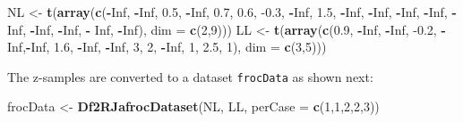 \documentclass[
]{book}
\newenvironment{Shaded}{\begin{snugshade}}{\end{snugshade}}
\newcommand{\DataTypeTok}[1]{\textcolor[rgb]{0.13,0.29,0.53}{#1}}
\newcommand{\DecValTok}[1]{\textcolor[rgb]{0.00,0.00,0.81}{#1}}
\newcommand{\FloatTok}[1]{\textcolor[rgb]{0.00,0.00,0.81}{#1}}
\newcommand{\KeywordTok}[1]{\textcolor[rgb]{0.13,0.29,0.53}{\textbf{#1}}}
\newcommand{\NormalTok}[1]{#1}
\newcommand{\OperatorTok}[1]{\textcolor[rgb]{0.81,0.36,0.00}{\textbf{#1}}}
\newcommand{\OtherTok}[1]{\textcolor[rgb]{0.56,0.35,0.01}{#1}}
\newcommand{\StringTok}[1]{\textcolor[rgb]{0.31,0.60,0.02}{#1}}
\begin{document}
\begin{Shaded}
\begin{Highlighting}[]
\NormalTok{NL <-}\StringTok{ }\KeywordTok{t}\NormalTok{(}\KeywordTok{array}\NormalTok{(}\KeywordTok{c}\NormalTok{(}\OperatorTok{-}\OtherTok{Inf}\NormalTok{, }\OperatorTok{-}\OtherTok{Inf}\NormalTok{,  }
                 \FloatTok{0.5}\NormalTok{, }\OperatorTok{-}\OtherTok{Inf}\NormalTok{, }
                 \FloatTok{0.7}\NormalTok{, }\FloatTok{0.6}\NormalTok{, }
                \FloatTok{-0.3}\NormalTok{, }\OperatorTok{-}\OtherTok{Inf}\NormalTok{, }
                 \FloatTok{1.5}\NormalTok{, }\OperatorTok{-}\OtherTok{Inf}\NormalTok{, }
                \OperatorTok{-}\OtherTok{Inf}\NormalTok{, }\OperatorTok{-}\OtherTok{Inf}\NormalTok{, }
                \OperatorTok{-}\OtherTok{Inf}\NormalTok{, }\OperatorTok{-}\OtherTok{Inf}\NormalTok{, }
                \OperatorTok{-}\OtherTok{Inf}\NormalTok{, }\OperatorTok{-}\OtherTok{Inf}\NormalTok{,}
              \OperatorTok{-}\StringTok{  }\OtherTok{Inf}\NormalTok{, }\OperatorTok{-}\OtherTok{Inf}\NormalTok{), }\DataTypeTok{dim =} \KeywordTok{c}\NormalTok{(}\DecValTok{2}\NormalTok{,}\DecValTok{9}\NormalTok{)))}
\NormalTok{LL <-}\StringTok{ }\KeywordTok{t}\NormalTok{(}\KeywordTok{array}\NormalTok{(}\KeywordTok{c}\NormalTok{(}\FloatTok{0.9}\NormalTok{, }\OperatorTok{-}\OtherTok{Inf}\NormalTok{, }\OperatorTok{-}\OtherTok{Inf}\NormalTok{, }
               \FloatTok{-0.2}\NormalTok{, }\OperatorTok{-}\OtherTok{Inf}\NormalTok{,}\OperatorTok{-}\OtherTok{Inf}\NormalTok{, }
                \FloatTok{1.6}\NormalTok{, }\OperatorTok{-}\OtherTok{Inf}\NormalTok{, }\OperatorTok{-}\OtherTok{Inf}\NormalTok{, }
                  \DecValTok{3}\NormalTok{,    }\DecValTok{2}\NormalTok{, }\OperatorTok{-}\OtherTok{Inf}\NormalTok{, }
                  \DecValTok{1}\NormalTok{,    }\FloatTok{2.5}\NormalTok{,  }\DecValTok{1}\NormalTok{), }\DataTypeTok{dim =} \KeywordTok{c}\NormalTok{(}\DecValTok{3}\NormalTok{,}\DecValTok{5}\NormalTok{)))}
\end{Highlighting}
\end{Shaded}

The z-samples are converted to a dataset \texttt{frocData} as shown next:

\begin{Shaded}
\begin{Highlighting}[]
\NormalTok{frocData <-}\StringTok{ }\KeywordTok{Df2RJafrocDataset}\NormalTok{(NL, LL, }\DataTypeTok{perCase =} \KeywordTok{c}\NormalTok{(}\DecValTok{1}\NormalTok{,}\DecValTok{1}\NormalTok{,}\DecValTok{2}\NormalTok{,}\DecValTok{2}\NormalTok{,}\DecValTok{3}\NormalTok{))}
\end{Highlighting}
\end{Shaded}
\end{document}
